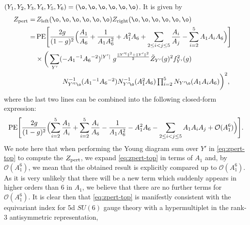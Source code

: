 \documentclass[letterpaper, 11pt]{article}
\begin{document}
{$(Y_1, Y_2, Y_3, Y_4, Y_5, Y_6) = (\o,\o,\o,\o,\o,\o)$.
It is given by
\begin{align}
\begin{split}
Z_{\rm pert} 
=& \,
Z_{\text{left}}(\o,\o,\o,\o,\o,\o)
Z_{\text{right}}(\o,\o,\o,\o,\o,\o)
\cr
=&\, 
\text{PE} \Biggl[ 
\frac{2g}{(1-g)^2} 
\Bigl( \frac{A_1}{A_6} + \frac{1}{A_1A_6^2} + A_1^2  A_6 
+ \sum_{2 \le i <  j \le 5} \frac{A_i}{A_j}
- \sum_{i=2}^5 A_1 A_i  A_6
\Bigr)
\Biggr]
\cr 
& 
\times \bigg(\sum_{Y'} ( - A_1{}^{-1} A_6{}^{-2})^{|Y'|} \ 
g^{\frac{\Vert Y'^t \Vert ^2+\Vert Y'\Vert ^2}{2}} \tilde{Z}_{Y'}(g)^2 f_{Y'}^2(g)
\cr 
& \qquad \qquad
\textstyle N_{Y'^t \o }^{-1} (A_1{}^{-1} A_6{}^{-2})
 N^{-1}_{Y' \o } (A_1^2  A_6)\prod_{i=2}^5 N_{Y' \o } (A_1 A_i  A_6)\bigg)^2 ,\label{eq:zpert-top}
\end{split}
\end{align}
where the last two lines can be  combined into the following closed-form expression:
\begin{align}
  \text{PE} \Biggl[ 
    \frac{2g}{(1-g)^2} 
    \Bigl(\sum_{i=2}^5  \frac{A_1}{A_i} +\sum_{i=2}^5  \frac{A_i}{A_6} - \frac{1}{A_1A_6^2} - A_1^2  A_6 
    - \sum_{2\leq i<j \leq 5} A_1 A_i  A_j + \mathcal{O}(A_1^6)
    \Bigr)
    \Biggr].
\end{align}
We note here that when performing the Young diagram sum over $Y'$ in \eqref{eq:zpert-top} to compute the $Z_{\rm pert}$, we expand \eqref{eq:zpert-top} in terms of $A_1$ and, by $\mathcal{O}(A_1^6)$, we mean that the obtained result is explicitly compared up to $\mathcal{O}(A_1^6)$. As it is very unlikely that there will be a new term which suddenly appears  in higher orders than 6 in $A_1$, we believe that there are no further terms for $\mathcal{O}(A_1^6)$.  
It is clear then that \eqref{eq:zpert-top} is manifestly consistent with the equivariant index  \cite{Shadchin:2005mx} for 5d $SU(6)$ gauge theory with a hypermultiplet in the rank-3 antisymmetric representation, %
}
\end{document}
